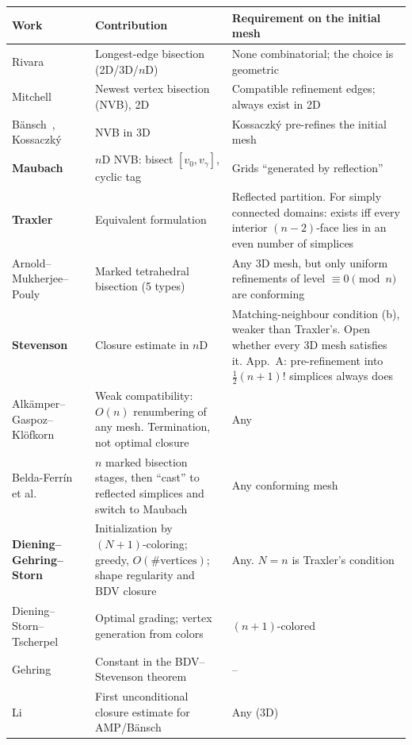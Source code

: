 \documentclass[11pt]{article}
\begin{document}
\begin{center}
\small
\begin{tabularx}{\textwidth}{@{}>{\raggedright\arraybackslash}p{3.6cm}LL@{}}
\toprule
Work & Contribution & Requirement on the initial mesh \\
\midrule
Rivara~\cite{rivara1984,rivara1991} & Longest-edge bisection (2D/3D/$n$D) & None combinatorial; the choice is geometric \\
Mitchell~\cite{mitchell1988,mitchell1991} & Newest vertex bisection (NVB), 2D & Compatible refinement edges; always exist in 2D~\cite{bdd2004} \\
Bänsch~\cite{bansch1991}, Kossaczký~\cite{kossaczky1994} & NVB in 3D & Kossaczký pre-refines the initial mesh \\
\textbf{Maubach}~\cite{maubach1995} & $n$D NVB: bisect $[v_0,v_\gamma]$, cyclic tag & Grids ``generated by reflection'' \\
\textbf{Traxler}~\cite{traxler1997} & Equivalent formulation & Reflected partition. For simply connected domains: exists iff every interior $(n{-}2)$-face lies in an even number of simplices \\
Arnold--Mukherjee--Pouly~\cite{amp2000} & Marked tetrahedral bisection (5 types) & Any 3D mesh, but only uniform refinements of level $\equiv 0 \pmod n$ are conforming \\
\textbf{Stevenson}~\cite{stevenson2008} & Closure estimate in $n$D & Matching-neighbour condition (b), weaker than Traxler's. Open whether every 3D mesh satisfies it. App.~A: pre-refinement into $\tfrac12(n{+}1)!$ simplices always does \\
Alkämper--Gaspoz--Klöfkorn~\cite{agk2018} & Weak compatibility: $O(n)$ renumbering of any mesh. Termination, not optimal closure & Any \\
Belda-Ferrín et al.~\cite{belda2018,belda2022,belda2023} & $n$ marked bisection stages, then ``cast'' to reflected simplices and switch to Maubach & Any conforming mesh \\
\textbf{Diening--Gehring--Storn}~\cite{dgs2025} & Initialization by $(N{+}1)$-coloring; greedy, $O(\#\text{vertices})$; shape regularity and BDV closure & Any. $N=n$ is Traxler's condition \\
Diening--Storn--Tscherpel~\cite{dst2023} & Optimal grading; vertex generation from colors & $(n{+}1)$-colored \\
Gehring~\cite{gehring2023} & Constant in the BDV--Stevenson theorem & -- \\
Li~\cite{li2026} & First unconditional closure estimate for AMP/Bänsch & Any (3D) \\
\bottomrule
\end{tabularx}
\end{center}
\end{document}
